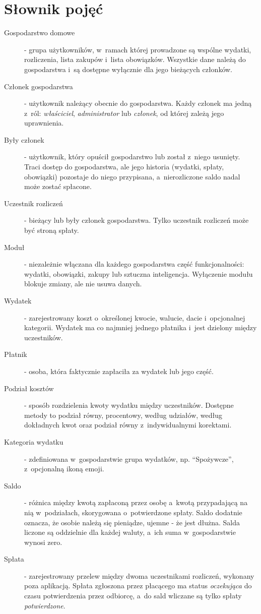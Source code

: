 \section{Słownik pojęć}

\begin{description}
  \item[Gospodarstwo domowe] - grupa użytkowników, w~ramach której prowadzone są wspólne wydatki, rozliczenia, lista zakupów i~lista obowiązków. Wszystkie dane należą do gospodarstwa i~są dostępne wyłącznie dla jego bieżących członków.
  \item[Członek gospodarstwa] - użytkownik należący obecnie do gospodarstwa. Każdy członek ma jedną z~ról: \emph{właściciel}, \emph{administrator} lub \emph{członek}, od której zależą jego uprawnienia.
  \item[Były członek] - użytkownik, który opuścił gospodarstwo lub został z~niego usunięty. Traci dostęp do gospodarstwa, ale jego historia (wydatki, spłaty, obowiązki) pozostaje do niego przypisana, a~nierozliczone saldo nadal może zostać spłacone.
  \item[Uczestnik rozliczeń] - bieżący lub były członek gospodarstwa. Tylko uczestnik rozliczeń może być stroną spłaty.
  \item[Moduł] - niezależnie włączana dla każdego gospodarstwa część funkcjonalności: wydatki, obowiązki, zakupy lub sztuczna inteligencja. Wyłączenie modułu blokuje zmiany, ale nie usuwa danych.
  \item[Wydatek] - zarejestrowany koszt o~określonej kwocie, walucie, dacie i~opcjonalnej kategorii. Wydatek ma co najmniej jednego płatnika i~jest dzielony między uczestników.
  \item[Płatnik] - osoba, która faktycznie zapłaciła za wydatek lub jego część.
  \item[Podział kosztów] - sposób rozdzielenia kwoty wydatku między uczestników. Dostępne metody to podział równy, procentowy, według udziałów, według dokładnych kwot oraz podział równy z~indywidualnymi korektami.
  \item[Kategoria wydatku] - zdefiniowana w~gospodarstwie grupa wydatków, np. \enquote{Spożywcze}, z~opcjonalną ikoną emoji.
  \item[Saldo] - różnica między kwotą zapłaconą przez osobę a~kwotą przypadającą na nią w~podziałach, skorygowana o~potwierdzone spłaty. Saldo dodatnie oznacza, że osobie należą się pieniądze, ujemne - że jest dłużna. Salda liczone są oddzielnie dla każdej waluty, a~ich suma w~gospodarstwie wynosi zero.
  \item[Spłata] - zarejestrowany przelew między dwoma uczestnikami rozliczeń, wykonany poza aplikacją. Spłata zgłoszona przez płacącego ma status \emph{oczekująca} do czasu potwierdzenia przez odbiorcę, a~do sald wliczane są tylko spłaty \emph{potwierdzone}.

\end{description}
